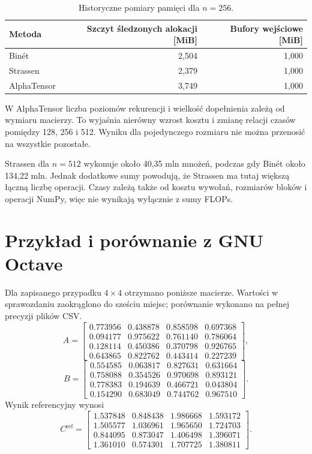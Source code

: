 \documentclass[11pt,a4paper]{article}
\begin{document}
\begin{table}[htbp]
\centering\small
\begin{tabular}{@{}lrr@{}}
\toprule
Metoda & Szczyt śledzonych alokacji [MiB] & Bufory wejściowe [MiB]\\
\midrule
Binét & 2,504 & 1,000\\
Strassen & 2,379 & 1,000\\
AlphaTensor & 3,749 & 1,000\\
\bottomrule
\end{tabular}
\caption{Historyczne pomiary pamięci dla $n=256$.}
\end{table}

W AlphaTensor liczba poziomów rekurencji i wielkość dopełnienia zależą
od wymiaru macierzy. To wyjaśnia nierówny wzrost kosztu i zmianę relacji
czasów pomiędzy 128, 256 i 512. Wyniku dla pojedynczego rozmiaru
nie można przenosić na wszystkie pozostałe.

Strassen dla $n=512$ wykonuje około 40,35 mln mnożeń, podczas gdy Binét
około 134,22 mln. Jednak dodatkowe sumy powodują, że Strassen ma tutaj
większą łączną liczbę operacji. Czasy zależą także od kosztu wywołań,
rozmiarów bloków i operacji NumPy, więc nie wynikają wyłącznie z sumy FLOPs.

\section{Przykład i porównanie z GNU Octave}
Dla zapisanego przypadku $4\times4$ otrzymano poniższe macierze.
Wartości w sprawozdaniu zaokrąglono do sześciu miejsc; porównanie
wykonano na pełnej precyzji plików CSV.
\[
A=\begin{bmatrix}
0.773956&0.438878&0.858598&0.697368\\
0.094177&0.975622&0.761140&0.786064\\
0.128114&0.450386&0.370798&0.926765\\
0.643865&0.822762&0.443414&0.227239
\end{bmatrix},
\]
\[
B=\begin{bmatrix}
0.554585&0.063817&0.827631&0.631664\\
0.758088&0.354526&0.970698&0.893121\\
0.778383&0.194639&0.466721&0.043804\\
0.154290&0.683049&0.744762&0.967510
\end{bmatrix}.
\]
Wynik referencyjny wynosi
\[
C^{\mathrm{ref}}=\begin{bmatrix}
1.537848&0.848438&1.986668&1.593172\\
1.505577&1.036961&1.965650&1.724703\\
0.844095&0.873047&1.406498&1.396071\\
1.361010&0.574301&1.707725&1.380811
\end{bmatrix}.
\]
\end{document}
